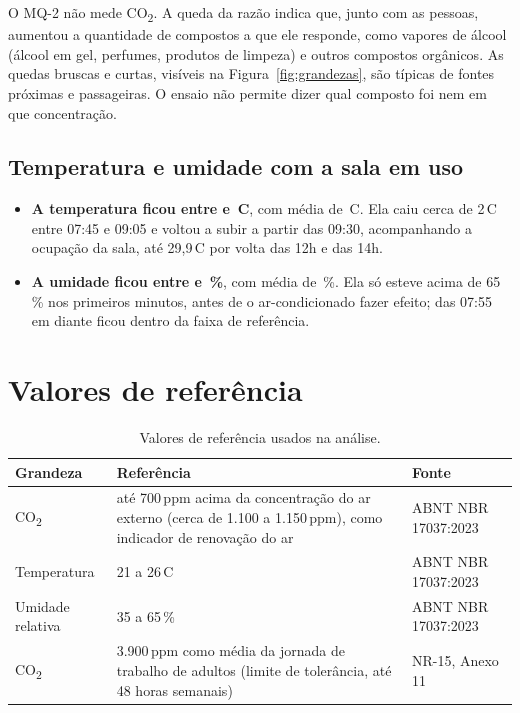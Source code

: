 \documentclass[11pt,a4paper]{article}
\newcommand{\cod}{CO\textsubscript{2}}
\newcommand{\grau}{\,\textdegree C}
\begin{document}
O MQ-2 não mede \cod{}. A queda da razão indica que, junto com as pessoas, aumentou a quantidade de compostos a que ele responde, como vapores de álcool (álcool em gel, perfumes, produtos de limpeza) e outros compostos orgânicos. As quedas bruscas e curtas, visíveis na Figura~\ref{fig:grandezas}, são típicas de fontes próximas e passageiras. O ensaio não permite dizer qual composto foi nem em que concentração.

\subsection{Temperatura e umidade com a sala em uso}

\begin{itemize}
\item \textbf{A temperatura ficou entre \TeUsoMin{} e \TeUsoMax\grau}, com média de \TeUsoMed\grau. Ela caiu cerca de 2\grau{} entre 07:45 e 09:05 e voltou a subir a partir das 09:30, acompanhando a ocupação da sala, até 29,9\grau{} por volta das 12h e das 14h.
\item \textbf{A umidade ficou entre \UmUsoMin{} e \UmUsoMax\,\%}, com média de \UmUsoMed\,\%. Ela só esteve acima de 65\,\% nos primeiros minutos, antes de o ar-condicionado fazer efeito; das 07:55 em diante ficou dentro da faixa de referência.
\end{itemize}

\section{Valores de referência}
\label{sec:referencias}

\begin{table}[H]
\centering\small
\begin{tabularx}{\linewidth}{@{}lXl@{}}
\toprule
\textbf{Grandeza} & \textbf{Referência} & \textbf{Fonte} \\
\midrule
\cod{} & até 700\,ppm acima da concentração do ar externo (cerca de 1.100 a 1.150\,ppm), como indicador de renovação do ar & ABNT NBR 17037:2023 \\
Temperatura & 21 a 26\grau & ABNT NBR 17037:2023 \\
Umidade relativa & 35 a 65\,\% & ABNT NBR 17037:2023 \\
\cod{} & 3.900\,ppm como média da jornada de trabalho de adultos (limite de tolerância, até 48 horas semanais) & NR-15, Anexo 11 \\
\bottomrule
\end{tabularx}
\caption{Valores de referência usados na análise.}
\label{tab:referencias}
\end{table}
\end{document}
